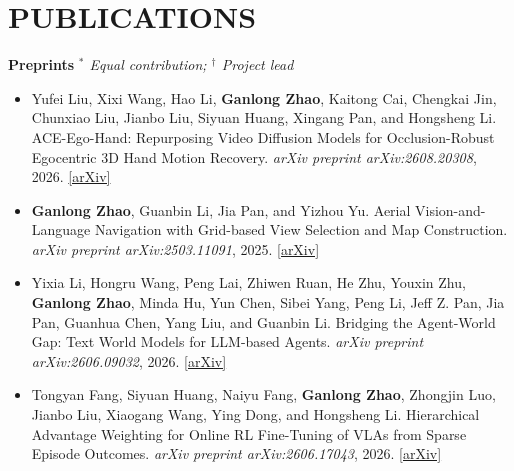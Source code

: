 \documentclass[a4paper,9pt]{extarticle}
\newcommand{\me}{\textbf{Ganlong Zhao}}
\newcommand{\publink}[2]{\href{#1}{[#2]}}
\newcommand{\arxiventry}[4]{%
    \item #1. #2. \textit{arXiv preprint arXiv:#3}, #4. \publink{https://arxiv.org/abs/#3}{arXiv}%
}
\begin{document}

\section*{PUBLICATIONS}

\noindent
\textbf{Preprints} \hfill \textit{$^*$ Equal contribution; $^\dagger$ Project lead}
\begin{itemize}[leftmargin=*, itemsep=1mm]
    \arxiventry{Yufei Liu, Xixi Wang, Hao Li, \me, Kaitong Cai, Chengkai Jin, Chunxiao Liu, Jianbo Liu, Siyuan Huang, Xingang Pan, and Hongsheng Li}
        {ACE-Ego-Hand: Repurposing Video Diffusion Models for Occlusion-Robust Egocentric 3D Hand Motion Recovery}
        {2608.20308}
        {2026}
    \arxiventry{\me, Guanbin Li, Jia Pan, and Yizhou Yu}
        {Aerial Vision-and-Language Navigation with Grid-based View Selection and Map Construction}
        {2503.11091}
        {2025}
    \arxiventry{Yixia Li, Hongru Wang, Peng Lai, Zhiwen Ruan, He Zhu, Youxin Zhu, \me, Minda Hu, Yun Chen, Sibei Yang, Peng Li, Jeff Z. Pan, Jia Pan, Guanhua Chen, Yang Liu, and Guanbin Li}
        {Bridging the Agent-World Gap: Text World Models for LLM-based Agents}
        {2606.09032}
        {2026}
    \arxiventry{Tongyan Fang, Siyuan Huang, Naiyu Fang, \me, Zhongjin Luo, Jianbo Liu, Xiaogang Wang, Ying Dong, and Hongsheng Li}
        {Hierarchical Advantage Weighting for Online RL Fine-Tuning of VLAs from Sparse Episode Outcomes}
        {2606.17043}
        {2026}
\end{itemize}
\end{document}

